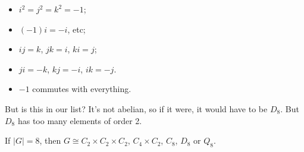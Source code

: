 \documentclass{../template/note}
\begin{document}
\begin{example}
        \begin{itemize}
            \item \(i^2 = j^2 = k^2 = -1\);
            \item \((-1)i = -i\), etc;
            \item \(ij = k\), \(jk = i\), \(ki = j\);
            \item \(ji = -k\), \(kj = -i\), \(ik = -j\).
            \item \(-1\) commutes with everything.
        \end{itemize}
        But is this in our list? It's not abelian, so if it were, it would have to be \(D_8\). But \(D_8\) has too many elements of order 2.
    \end{example}
    
    \begin{lemma}
        If \(|G| = 8\), then \(G \cong C_2 \times C_2 \times C_2\), \(C_4 \times C_2\), \(C_8\), \(D_8\) or \(Q_8\).
    \end{lemma}
    
\end{document}
